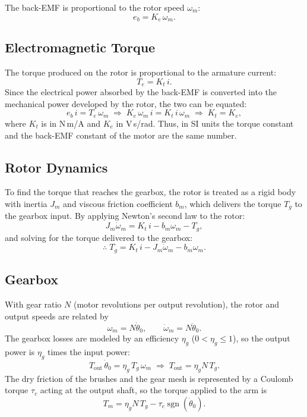 \documentclass[a4paper,11pt]{article}
\newcommand{\sgn}{\operatorname{sgn}}
\begin{document}
The back-EMF is proportional to the rotor speed $\omega_m$:
\begin{equation}
  e_b = K_e\, \omega_m .
  \label{eq:emf}
\end{equation}

\subsection{Electromagnetic Torque}
The torque produced on the rotor is proportional to the armature current:
\begin{equation}
  T_e = K_t\, i .
\end{equation}
Since the electrical power absorbed by the back-EMF is converted into the mechanical power developed by the rotor, the two can be equated:
\begin{equation}
  e_b\, i = T_e\, \omega_m \;\Rightarrow\; K_e\, \omega_m\, i = K_t\, i\, \omega_m \;\Rightarrow\; K_t = K_e ,
  \label{eq:KtKe}
\end{equation}
where $K_t$ is in N\,m/A and $K_e$ in V\,s/rad. Thus, in SI units the torque constant and the back-EMF constant of the motor are the same number.

\subsection{Rotor Dynamics}
To find the torque that reaches the gearbox, the rotor is treated as a rigid body with inertia $J_m$ and viscous friction coefficient $b_m$, which delivers the torque $T_g$ to the gearbox input. By applying Newton's second law to the rotor:
\begin{equation}
  J_m \dot\omega_m = K_t\, i - b_m \omega_m - T_g ,
\end{equation}
and solving for the torque delivered to the gearbox:
\begin{equation}
  \therefore\; T_g = K_t\, i - J_m \dot\omega_m - b_m \omega_m .
  \label{eq:rotor}
\end{equation}

\subsection{Gearbox}
With gear ratio $N$ (motor revolutions per output revolution), the rotor and output speeds are related by
\begin{equation}
  \omega_m = N \dot\theta_0, \qquad \dot\omega_m = N \ddot\theta_0 .
  \label{eq:gear}
\end{equation}
The gearbox losses are modeled by an efficiency $\eta_g$ ($0 < \eta_g \le 1$), so the output power is $\eta_g$ times the input power:
\begin{equation}
  T_{\mathrm{out}}\, \dot\theta_0 = \eta_g\, T_g\, \omega_m \;\Rightarrow\; T_{\mathrm{out}} = \eta_g N\, T_g .
\end{equation}
The dry friction of the brushes and the gear mesh is represented by a Coulomb torque $\tau_c$ acting at the output shaft, so the torque applied to the arm is
\begin{equation}
  T_m = \eta_g N\, T_g - \tau_c \sgn(\dot\theta_0) .
  \label{eq:Tout}
\end{equation}
\end{document}
